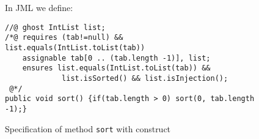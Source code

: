 \begin{figure}[t!]
{\small In JML we define:
\begin{verbatim}
//@ ghost IntList list;
/*@ requires (tab!=null) && list.equals(IntList.toList(tab))
    assignable tab[0 .. (tab.length -1)], list;
    ensures list.equals(IntList.toList(tab)) &&
             list.isSorted() && list.isInjection();
 @*/
public void sort() {if(tab.length > 0) sort(0, tab.length -1);}\end{verbatim}}
\caption{Specification of method \texttt{sort} with \native construct}
\label{sortnat} 
\end{figure}




